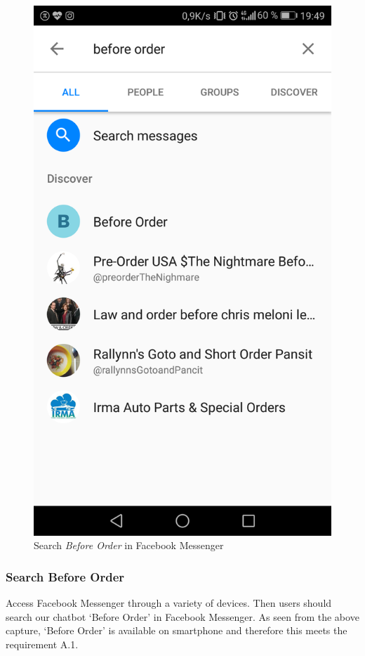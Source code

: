 \begin{figure}[htbp]
\centerline{\includegraphics[height=\custompicheight]{./pictures/facebook_search_chatbot}}
\caption{Search \emph{Before Order} in Facebook Messenger}
\label{fig:Before Order_search}
\end{figure}
\FloatBarrier
\subsubsection{Search Before Order}
Access Facebook Messenger through a variety of devices. Then users should search our chatbot ‘Before Order’ in Facebook Messenger. As seen from the above capture, ‘Before Order’ is available on smartphone and therefore this meets the requirement A.1.

